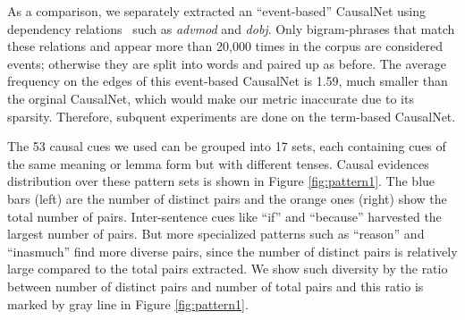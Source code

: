 \documentclass[letterpaper]{article}
\newcommand{\figref}[1]{Figure \ref{#1}}
\begin{document}
As a comparison, we separately extracted an
``event-based'' CausalNet using dependency relations~\cite{chen2014fast}
such as \emph{advmod} and \emph{dobj}.
Only bigram-phrases that match these relations and appear more than
20,000 times in the corpus are considered events; otherwise they are split
into words and paired up as before.
The average frequency on the edges of this event-based CausalNet
is 1.59, much smaller than the orginal CausalNet,
which would make our metric inaccurate due to its sparsity.
Therefore, subquent
experiments are done on the term-based CausalNet.

The 53 causal cues we used can be grouped into 17 sets, each
containing cues of the same meaning or lemma form but with different
tenses. Causal evidences distribution over these pattern sets 
is shown in Figure \ref{fig:pattern1}. 
The blue bars (left) are the number of distinct
pairs and the orange ones (right) show the total number of pairs.
Inter-sentence cues like ``if'' and ``because'' harvested the
largest number of pairs. But more specialized patterns such as
``reason'' and ``inasmuch'' find more diverse pairs, since the
number of distinct pairs is relatively large compared to the total
pairs extracted.
We show such diversity by the ratio between number of distinct pairs
and number of total pairs
and this ratio is marked by gray line in \figref{fig:pattern1}.
\end{document}
